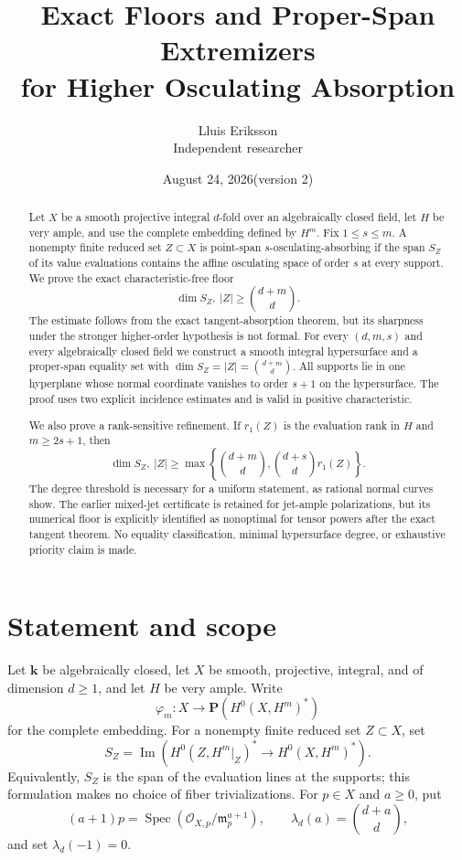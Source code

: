 \documentclass[11pt]{article}
\title{Exact Floors and Proper-Span Extremizers\\for Higher Osculating Absorption}
\author{Lluis Eriksson\\\small Independent researcher}
\date{August 24, 2026\quad (version 2)}
\theoremstyle{definition}
\theoremstyle{remark}
\theoremstyle{plain}
\newcommand{\PP}{\mathbf P}
\newcommand{\kk}{\mathbf k}
\newcommand{\cO}{\mathcal O}
\begin{document}
\maketitle

\begin{abstract}
Let $X$ be a smooth projective integral $d$-fold over an algebraically
closed field, let $H$ be very ample, and use the complete embedding defined
by $H^m$.  Fix $1\leq s\leq m$.  A nonempty finite reduced set
$Z\subset X$ is point-span $s$-osculating-absorbing if the span $S_Z$ of
its value evaluations contains the affine osculating space of order $s$ at
every support.  We prove the exact characteristic-free floor
\[
 \dim S_Z,\ |Z|\geq \binom{d+m}{d}.
\]
The estimate follows from the exact tangent-absorption theorem, but its
sharpness under the stronger higher-order hypothesis is not formal.  For
every $(d,m,s)$ and every algebraically closed field we construct a smooth
integral hypersurface and a proper-span equality set with
\(\dim S_Z=|Z|=\binom{d+m}{d}\).  All supports lie in one hyperplane whose
normal coordinate vanishes to order $s+1$ on the hypersurface.  The proof
uses two explicit incidence estimates and is valid in positive
characteristic.

We also prove a rank-sensitive refinement.  If $r_1(Z)$ is the evaluation
rank in $H$ and $m\geq2s+1$, then
\[
 \dim S_Z,\ |Z|\geq
 \max\left\{\binom{d+m}{d},\binom{d+s}{d}r_1(Z)\right\}.
\]
The degree threshold is necessary for a uniform statement, as rational
normal curves show.  The earlier mixed-jet certificate is retained for
jet-ample polarizations, but its numerical floor is explicitly identified
as nonoptimal for tensor powers after the exact tangent theorem.  No equality
classification, minimal hypersurface degree, or exhaustive priority claim is
made.
\end{abstract}

\section{Statement and scope}

Let $\kk$ be algebraically closed, let $X$ be smooth, projective, integral,
and of dimension $d\geq1$, and let $H$ be very ample.  Write
\[
 \varphi_m:X\longrightarrow\PP(H^0(X,H^m)^*)
\]
for the complete embedding.  For a nonempty finite reduced set $Z\subset X$,
set
\[
 S_Z=\operatorname{Im}\!\left(
 H^0(Z,H^m|_Z)^*\longrightarrow H^0(X,H^m)^*\right).
\]
Equivalently, $S_Z$ is the span of the evaluation lines at the supports;
this formulation makes no choice of fiber trivializations.
For $p\in X$ and $a\geq0$, put
\[
 (a+1)p=\operatorname{Spec}(\cO_{X,p}/\mathfrak m_p^{a+1}),\qquad
 \lambda_d(a)=\binom{d+a}{d},
\]
and set $\lambda_d(-1)=0$.
\end{document}

